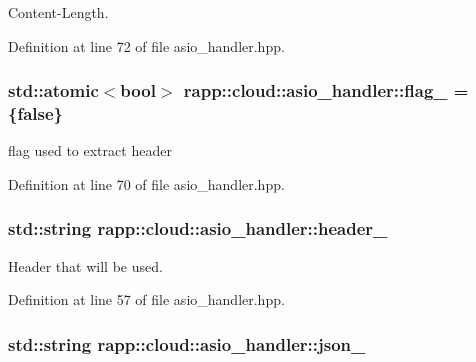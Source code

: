 Content-\/\-Length. 



Definition at line 72 of file asio\-\_\-handler.\-hpp.

\hypertarget{classrapp_1_1cloud_1_1asio__handler_aab1f045ee4c4e3b3d931513d91ef9524}{
\subsubsection[{flag\-\_\-}]{\setlength{\rightskip}{0pt plus 5cm}std\-::atomic$<$bool$>$ rapp\-::cloud\-::asio\-\_\-handler\-::flag\-\_\- = \{false\}\hspace{0.3cm}{\ttfamily [protected]}}}\label{classrapp_1_1cloud_1_1asio__handler_aab1f045ee4c4e3b3d931513d91ef9524}


flag used to extract header 



Definition at line 70 of file asio\-\_\-handler.\-hpp.

\hypertarget{classrapp_1_1cloud_1_1asio__handler_aa43515d00f301b7c2fe098c6cfcfe518}{
\subsubsection[{header\-\_\-}]{\setlength{\rightskip}{0pt plus 5cm}std\-::string rapp\-::cloud\-::asio\-\_\-handler\-::header\-\_\-\hspace{0.3cm}{\ttfamily [protected]}}}\label{classrapp_1_1cloud_1_1asio__handler_aa43515d00f301b7c2fe098c6cfcfe518}


Header that will be used. 



Definition at line 57 of file asio\-\_\-handler.\-hpp.

\hypertarget{classrapp_1_1cloud_1_1asio__handler_a1a4fecd26c43b20bb7b1349c9f494eb2}{
\subsubsection[{json\-\_\-}]{\setlength{\rightskip}{0pt plus 5cm}std\-::string rapp\-::cloud\-::asio\-\_\-handler\-::json\-\_\-\hspace{0.3cm}{\ttfamily [protected]}}}\label{classrapp_1_1cloud_1_1asio__handler_a1a4fecd26c43b20bb7b1349c9f494eb2}



